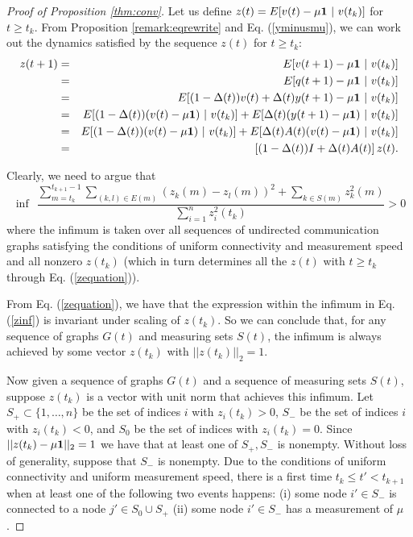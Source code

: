 \documentclass[final]{siamltex}
\begin{document}
\begin{proof}[Proof of {{{Proposition}}} \ref{thm:conv}]
Let us {{{define}}} $z(t) = E[v(t) - \mu {{\bf 1}} ~|~ v(t_k)]$ for $t \geq t_k$.  {{{From Proposition \ref{remark:eqrewrite} and Eq. (\ref{yminusmu}), we can work out 
the dynamics satisfied by the sequence $z(t)$ for $t \geq t_k$:  \begin{eqnarray} z(t+1) & = &  E[v(t+1) - \mu {{\bf 1}} ~|~ v(t_k)] \nonumber \\
& = & E[q(t+1) - \mu {{\bf 1}} ~|~ v(t_k)] \nonumber \\
&  = & E[(1-\Delta(t))v(t) + \Delta(t) y(t+1) - \mu {{\bf 1}} ~|~ v(t_k)] \nonumber \\
& = & E[ (1-\Delta(t))(v(t) - \mu {{\bf 1}}) ~|~ v(t_k)] + E[\Delta(t) (y(t+1) - \mu {{\bf 1}}) ~|~ v(t_k) ] \nonumber  \\
& = & E[ (1-\Delta(t))(v(t) - \mu {{\bf 1}}) ~|~ v(t_k)] + E[\Delta(t) A(t) (v(t) - \mu {{\bf 1}}) ~|~ v(t_k) ] \nonumber  \\
& = & \left[ (1- \Delta(t)) I + \Delta(t) A(t) \right] z(t) \label{zequation}.\end{eqnarray}}}}

Clearly, we need to argue that \begin{equation} \label{zinf} \inf ~~ \frac{\sum_{m=t_k}^{t_{k+1}-1} \sum_{(k,l) \in E(m)} (z_k(m) - z_l(m))^2 + \sum_{k \in S(m)} z_k^2(m) }{\sum_{i=1}^n z_i^2(t_k)} > 0  \end{equation} where the infimum is taken over all sequences of undirected communication graphs satisfying the conditions of uniform connectivity and measurement speed and {{{all nonzero}}} $z(t_k)$ (which in turn determines all the $z(t)$ with $t \geq t_k$ through Eq. (\ref{zequation})). 

From Eq. (\ref{zequation}), we have that the expression within the infimum in Eq. (\ref{zinf}) is invariant under scaling of $z(t_k)$. So
we can conclude that, for any sequence of graphs $G(t)$ and measuring sets $S(t)$,  the infimum is always achieved by some vector $z(t_k)$ with $||z(t_k)||_2=1$. 

Now given a sequence of graphs $G(t)$ and a sequence of measuring sets $S(t)$, suppose $z(t_k)$ is a vector with unit norm that achieves this infimum.  Let $S_+ \subset \{1, \ldots, n\}$ be the set of indices $i$ with $z_i(t_k) > 0$, $S_-$ be the set of indices $i$ with $z_i(t_k) < 0$, and $S_0$ be the set of indices with $z_i(t_k)=0$. Since $||z(t_k) - \mu {{\bf 1}}||_2 = 1$ we have that at least one of $S_+, S_-$ is nonempty. Without loss of generality, suppose that $S_-$ is nonempty. Due to the conditions of uniform connectivity and uniform measurement speed, there is a first time $t_k \leq t' < t_{k+1}$ when at least one of the following two events happens: (i) some node $i' \in S_-$ is connected to a node $j' \in S_0 \cup S_+$ (ii) some node $i' \in S_-$ has a measurement of $\mu$. 


\end{proof}
\end{document}
